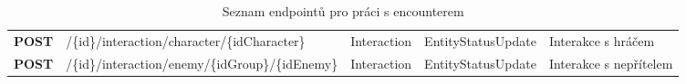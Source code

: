 \begin{table}[h]
{\begin{tabular}{>{\bfseries}r >{\ttfamily}l >{\ttfamily}l >{\ttfamily}H l}
        POST & 
            /\{id\}/interaction/character/\{idCharacter\} & 
            Interaction & EntityStatusUpdate & Interakce s hráčem \\
        POST & 
            /\{id\}/interaction/enemy/\{idGroup\}/\{idEnemy\} & 
            Interaction & EntityStatusUpdate & Interakce s nepřítelem \\
        
        \bottomrule
    \end{tabular}}
    \caption{Seznam endpointů pro práci s encounterem}
    \label{tab:endpoints}
\end{table}